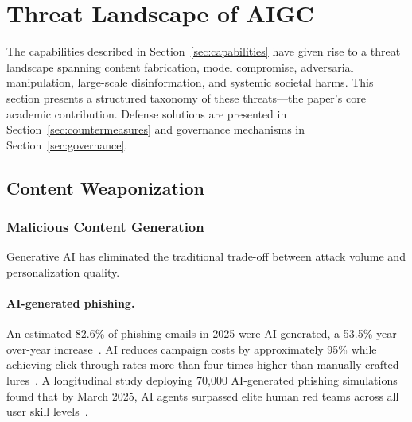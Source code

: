 
\section{Threat Landscape of AIGC}
\label{sec:threats}

The capabilities described in Section~\ref{sec:capabilities} have given rise to a threat landscape spanning content fabrication, model compromise, adversarial manipulation, large-scale disinformation, and systemic societal harms. This section presents a structured taxonomy of these threats---the paper's core academic contribution. Defense solutions are presented in Section~\ref{sec:countermeasures} and governance mechanisms in Section~\ref{sec:governance}.


\subsection{Content Weaponization}
\label{sec:threat-weapon}

\subsubsection{Malicious Content Generation}
\label{sec:threat-phishing}

Generative AI has eliminated the traditional trade-off between attack volume and personalization quality.

\paragraph{AI-generated phishing.}
An estimated 82.6\% of phishing emails in 2025 were AI-generated, a 53.5\% year-over-year increase~\cite{knowbe4_2025}. AI reduces campaign costs by approximately 95\% while achieving click-through rates more than four times higher than manually crafted lures~\cite{slashnext2025}. A longitudinal study deploying 70,000 AI-generated phishing simulations found that by March 2025, AI agents surpassed elite human red teams across all user skill levels~\cite{hoxhunt2025}.

